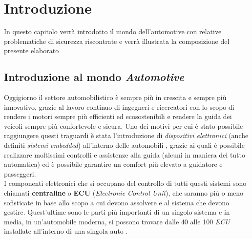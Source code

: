 \chapter{Introduzione}
\begin{citazione}
    In questo capitolo verrà introdotto il mondo dell'automotive con relative problematiche di sicurezza riscontrate e verrà illustrata la composizione del presente elaborato
\end{citazione}

\section{Introduzione al mondo \emph{Automotive}}
Oggigiorno il settore automobilistico è sempre più in crescita e sempre più innovativo, grazie al lavoro continuo di ingegneri e ricercatori con lo scopo di rendere i motori sempre più efficienti ed ecosostenibili e rendere la guida dei veicoli sempre più confortevole e sicura. Uno dei motivi per cui è stato possibile raggiungere questi traguardi è stata l'introduzione di \emph{dispositivi elettronici} (anche definiti \emph{sistemi embedded}) all'interno delle automobili \cite{auto_electronics}, grazie ai quali è possibile realizzare moltissimi controlli e assistenze alla guida (alcuni in maniera del tutto automatica) ed è possibile garantire un comfort più elevato a guidatore e passeggeri.\\
I componenti elettronici che si occupano del controllo di tutti questi sistemi sono chiamati \textbf{centraline} o \textbf{ECU} (\emph{Electronic Control Unit}), che saranno più o meno sofisticate in base allo scopo a cui devono assolvere e al sistema che devono gestire. Quest'ultime sono le parti più importanti di un singolo sistema e in media, in un'automobile moderna, si possono trovare dalle 40 alle 100 \emph{ECU} installate all'interno di una singola auto \cite{auto_electronics}.

